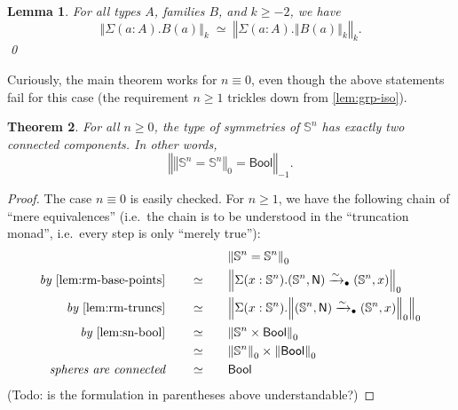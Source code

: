 \documentclass[11pt,a4paper,oneside,reqno]{amsart}
\newtheorem{theorem}{Theorem}
\newtheorem{lemma}[theorem]{Lemma}
\theoremstyle{definition}
\theoremstyle{remark}
\newcommand{\sph}[1]{{\mathbb S}^{#1}}
\newcommand{\trunc}[2]{\mathopen{}\left\Vert #2\right\Vert_{#1}\mathclose{}}
\newcommand{\North}{\mathsf N}
\begin{document}
\begin{lemma} \label{lem:rm-truncs}
 For all types $A$, families $B$, and $k \geq -2$, we have
 \begin{equation}
  \trunc k {\Sigma (a : A). B(a)} \; \simeq \; \trunc k {\Sigma (a : A). \trunc k {B(a)}}.
 \end{equation}
 \qed
\end{lemma}

Curiously, the main theorem works for $n \equiv 0$, even though the above statements fail for this case (the requirement $n \geq 1$ trickles down from \cref{lem:grp-iso}).
\begin{theorem}
 For all $n \geq 0$, the type of symmetries of $\sph n$ has exactly two connected components.
 In other words,
 \begin{equation}
  \trunc {-1} {\trunc 0 {\sph n = \sph n} = \mathsf{Bool}}.
 \end{equation}
\end{theorem}
\begin{proof}
 The case $n \equiv 0$ is easily checked.
 For $n \geq 1$, we have the following chain of ``mere equivalences'' (i.e.\ the chain is to be understood in the ``truncation monad'', i.e.\ every step is only ``merely true''):
  \begin{alignat}{5}
  &&&\trunc 0 {\sph n = \sph n} \\
  \textit{by }\cref{lem:rm-base-points} \qquad &\simeq &\quad& \trunc 0 {\Sigma(x : \sph n).(\sph n, \North) \xrightarrow{\sim}_\bullet (\sph n, x)}  \\
  \textit{by }\cref{lem:rm-truncs} \qquad &\simeq && \trunc 0 {\Sigma(x : \sph n).\trunc 0 {(\sph n, \North) \xrightarrow{\sim}_\bullet (\sph n, x)}}  \\
  \textit{by }\cref{lem:sn-bool} \qquad &\simeq && \trunc 0 {\sph n \times \mathsf{Bool}}  \\
  \textit{ } \qquad &\simeq && \trunc 0 {\sph n} \times \trunc 0 {\mathsf{Bool}}    \\
  \textit{spheres are connected} \qquad &\simeq && \mathsf{Bool}
 \end{alignat}
(Todo: is the formulation in parentheses above understandable?)
\end{proof}



\end{document}
